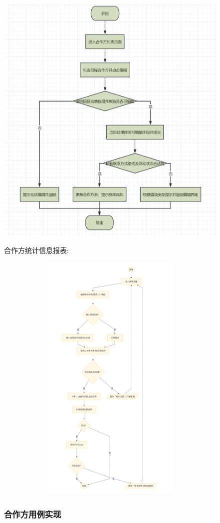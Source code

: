\documentclass[]{article}
\begin{document}
\includegraphics[width=4.45694in,height=4.83819in]{media/media/image_2-4-3.png}

合作方统计信息报表:

\includegraphics[width=4.45694in,height=4.83819in]{media/media/image_2-4-4.png}


\hypertarget{ux7528ux4f8b-2ux5b9eux73b0}{%
  \subsubsection{合作方用例实现}\label{ux7528ux4f8b-2ux5b9eux73b0}}
\end{document}
